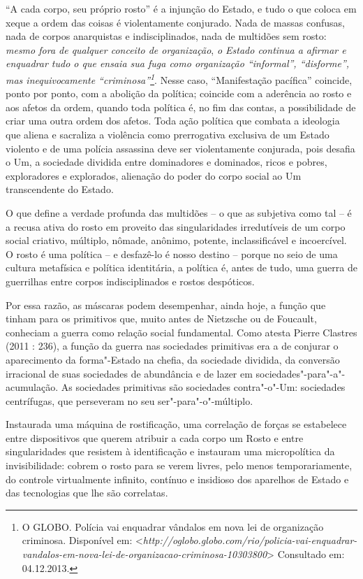 ``A cada corpo, seu próprio rosto'' é a injunção do Estado, e tudo o que
coloca em xeque a ordem das coisas é violentamente conjurado. Nada de
massas confusas, nada de corpos anarquistas e indisciplinados, nada de
multidões sem rosto: \emph{\emph{mesmo fora de qualquer conceito de
organização}}, \emph{\emph{o Estado continua a afirmar e enquadrar tudo
o que ensaia sua fuga como organização ``informal'', ``disforme'', mas
inequivocamente ``criminosa''}\emph{\footnote{O GLOBO. Polícia vai
  enquadrar vândalos em nova lei de organização criminosa. Disponível
  em:
  \textless{}{\emph{http://oglobo.globo.com/rio/policia-vai-enquadrar-vandalos-em-nova-lei-de-organizacao-criminosa-10303800}}\textgreater{}
  Consultado em: 04.12.2013.}}}. Nesse caso, ``Manifestação pacífica''
coincide, ponto por ponto, com a abolição da política; coincide com a
aderência ao rosto e aos afetos da ordem, quando toda política é, no fim
das contas, a possibilidade de criar uma outra ordem dos afetos. Toda
ação política que combata a ideologia que aliena e sacraliza a violência
como prerrogativa exclusiva de um Estado violento e de uma polícia
assassina deve ser violentamente conjurada, pois desafia o Um, a
sociedade dividida entre dominadores e dominados, ricos e pobres,
exploradores e explorados, alienação do poder do corpo social ao Um
transcendente do Estado.

O que define a verdade profunda das multidões -- o que as subjetiva como
tal -- é a recusa ativa do rosto em proveito das singularidades
irredutíveis de um corpo social criativo, múltiplo, nômade, anônimo,
potente, inclassificável e incoercível. O rosto é uma política -- e
desfazê-lo é nosso destino -- porque no seio de uma cultura metafísica e
política identitária, a política é, antes de tudo, uma guerra de
guerrilhas entre corpos indisciplinados e rostos despóticos.

Por essa razão, as máscaras podem desempenhar, ainda hoje, a função que
tinham para os primitivos que, muito antes de Nietzsche ou de Foucault,
conheciam a guerra como relação social fundamental. Como atesta Pierre
Clastres (2011 : 236), a função da guerra nas sociedades primitivas era
a de conjurar o aparecimento da forma"-Estado na chefia, da sociedade
dividida, da conversão irracional de suas sociedades de abundância e de
lazer em sociedades"-para"-a"-acumulação. As sociedades primitivas são
sociedades contra"-o"-Um: sociedades centrífugas, que perseveram no seu
ser"-para"-o"-múltiplo.

Instaurada uma máquina de rostificação, uma correlação de forças se
estabelece entre dispositivos que querem atribuir a cada corpo um Rosto
e entre singularidades que resistem à identificação e instauram uma
micropolítica da invisibilidade: cobrem o rosto para se verem livres,
pelo menos temporariamente, do controle virtualmente infinito, contínuo
e insidioso dos aparelhos de Estado e das tecnologias que lhe são
correlatas.

